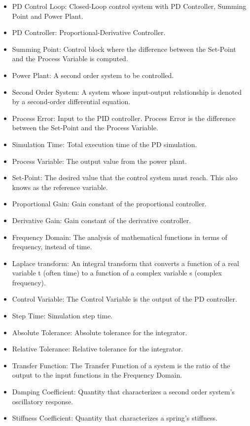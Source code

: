\documentclass[12pt]{article}
\begin{document}
\begin{itemize}
\item{PD Control Loop: Closed-Loop control system with PD Controller, Summing Point and Power Plant.}
\item{PD Controller: Proportional-Derivative Controller.}
\item{Summing Point: Control block where the difference between the Set-Point and the Process Variable is computed.}
\item{Power Plant: A second order system to be controlled.}
\item{Second Order System: A system whose input-output relationship is denoted by a second-order differential equation.}
\item{Process Error: Input to the PID controller. Process Error is the difference between the Set-Point and the Process Variable.}
\item{Simulation Time: Total execution time of the PD simulation.}
\item{Process Variable: The output value from the power plant.}
\item{Set-Point: The desired value that the control system must reach. This also knows as the reference variable.}
\item{Proportional Gain: Gain constant of the proportional controller.}
\item{Derivative Gain: Gain constant of the derivative controller.}
\item{Frequency Domain: The analysis of mathematical functions in terms of frequency, instead of time.}
\item{Laplace transform: An integral transform that converts a function of a real variable t (often time) to a function of a complex variable s (complex frequency).}
\item{Control Variable: The Control Variable is the output of the PD controller.}
\item{Step Time: Simulation step time.}
\item{Absolute Tolerance: Absolute tolerance for the integrator.}
\item{Relative Tolerance: Relative tolerance for the integrator.}
\item{Transfer Function: The Transfer Function of a system is the ratio of the output to the input functions in the Frequency Domain.}
\item{Damping Coefficient: Quantity that characterizes a second order system's oscillatory response.}
\item{Stiffness Coefficient: Quantity that characterizes a spring's stiffness.}
\end{itemize}
\end{document}
